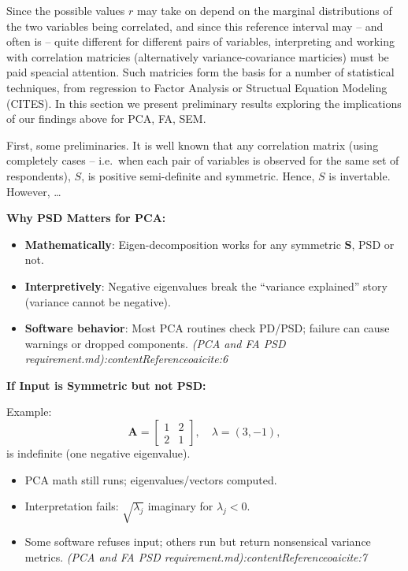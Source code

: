 \documentclass[
  12pt,
]{article}
\providecommand{\tightlist}{%
  \setlength{\itemsep}{0pt}\setlength{\parskip}{0pt}}
\theoremstyle{plain}
\theoremstyle{definition}
\theoremstyle{remark}
\begin{document}
Since the possible values \(r\) may take on depend on the marginal
distributions of the two variables being correlated, and since this
reference interval may -- and often is -- quite different for different
pairs of variables, interpreting and working with correlation matricies
(alternatively variance-covariance marticies) must be paid speacial
attention. Such matricies form the basis for a number of statistical
techniques, from regression to Factor Analysis or Structual Equation
Modeling (CITES). In this section we present preliminary results
exploring the implications of our findings above for PCA, FA, SEM.

First, some preliminaries. It is well known that any correlation matrix
(using completely cases -- i.e.~when each pair of variables is observed
for the same set of respondents), \(S\), is positive semi-definite and
symmetric. Hence, \(S\) is invertable. However, \ldots{}

\textbf{Why PSD Matters for PCA:}

\begin{itemize}
\tightlist
\item
  \textbf{Mathematically}: Eigen-decomposition works for any symmetric
  \(\mathbf{S}\), PSD or not.
\item
  \textbf{Interpretively}: Negative eigenvalues break the ``variance
  explained'' story (variance cannot be negative).
\item
  \textbf{Software behavior}: Most PCA routines check PD/PSD; failure
  can cause warnings or dropped components. \emph{(PCA and FA PSD
  requirement.md):contentReference{oaicite:6}}
\end{itemize}

\textbf{If Input is Symmetric but not PSD:}

Example:\\
\[
\mathbf{A} = \begin{bmatrix} 1 & 2 \\ 2 & 1 \end{bmatrix},\quad \lambda = (3,-1),
\] is indefinite (one negative eigenvalue).

\begin{itemize}
\tightlist
\item
  PCA math still runs; eigenvalues/vectors computed.
\item
  Interpretation fails: \(\sqrt{\lambda_j}\) imaginary for
  \(\lambda_j<0\).
\item
  Some software refuses input; others run but return nonsensical
  variance metrics. \emph{(PCA and FA PSD
  requirement.md):contentReference{oaicite:7}}
\end{itemize}
\end{document}
